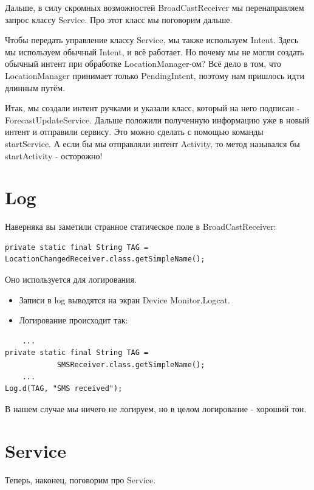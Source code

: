\documentclass[12 pt]{article}
\begin{document}
    Дальше, в силу скромных возможностей BroadCastReceiver мы перенаправляем запрос классу Service. Про этот класс мы поговорим дальше.
    
    Чтобы передать управление классу Service, мы также используем Intent. Здесь мы используем обычный Intent, и всё работает. Но почему мы не могли создать обычный интент при обработке LocationManager-ом? Всё дело в том, что LocationManager принимает только PendingIntent, поэтому нам пришлось идти длинным путём.
    
    Итак, мы создали интент ручками и указали класс, который на него подписан - ForecastUpdateService. Дальше положили полученную информацию уже в новый интент и отправили сервису. Это можно сделать с помощью команды startService. А если бы мы отправляли интент Activity, то метод назывался бы startActivity - осторожно!
            
\section{Log}     
    Наверняка вы заметили странное статическое поле в BroadCastReceiver: 
    \begin{lstlisting}
private static final String TAG = LocationChangedReceiver.class.getSimpleName();
    \end{lstlisting}
    
    Оно используется для логирования.
    
    \begin{itemize}
        \item Записи в log выводятся на экран Device Monitor.Logcat.
        \item Логирование происходит так:
    \end{itemize}
    \begin{lstlisting}
    ...
private static final String TAG = 
            SMSReceiver.class.getSimpleName();
    ...
Log.d(TAG, "SMS received");    
    \end{lstlisting}

    В нашем случае мы ничего не логируем, но в целом логирование - хороший тон.
    
    \section{Service}    
    Теперь, наконец, поговорим про Service.
    
\end{document}
